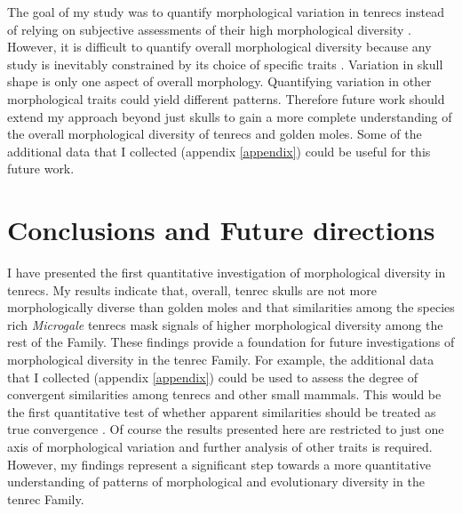 	The goal of my study was to quantify morphological variation in tenrecs instead of relying on subjective assessments of their high morphological diversity \citep{Olson2013, Soarimalala2011, Eisenberg1969}. However, it is difficult to quantify overall morphological diversity because any study is inevitably constrained by its choice of specific traits \citep{Roy1997}. Variation in skull shape is only one aspect of overall morphology. Quantifying variation in other morphological traits could yield different patterns. Therefore future work should extend my approach beyond just skulls to gain a more complete understanding of the overall morphological diversity of tenrecs and golden moles. Some of the additional data that I collected (appendix \ref{appendix}) could be useful for this future work.



\section{Conclusions and Future directions}
\label{sect:concl}

	I have presented the first quantitative investigation of morphological diversity in tenrecs. My results indicate that, overall, tenrec skulls are not more morphologically diverse than golden moles and that similarities among the species rich \textit{Microgale} tenrecs mask signals of higher morphological diversity among the rest of the Family. These findings provide a foundation for future investigations of morphological diversity in the tenrec Family. For example, the additional data that I collected (appendix \ref{appendix}) could be used to assess the degree of convergent similarities among tenrecs and other small mammals. This would be the first quantitative test of whether apparent similarities \citep{Olson2013, Soarimalala2011, Eisenberg1969} should be treated as true convergence \citep[e.g.][]{Losos2011, Stayton2008}.
	Of course the results presented here are restricted to just one axis of morphological variation and further analysis of other traits is required. However, my findings represent a significant step towards a more quantitative understanding of patterns of morphological and evolutionary diversity in the tenrec Family. 







